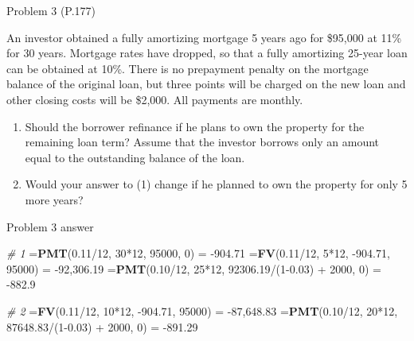 \documentclass[ignorenonframetext,]{beamer}
\newenvironment{Shaded}{\begin{snugshade}}{\end{snugshade}}
\newcommand{\KeywordTok}[1]{\textcolor[rgb]{0.13,0.29,0.53}{\textbf{{#1}}}}
\newcommand{\DecValTok}[1]{\textcolor[rgb]{0.00,0.00,0.81}{{#1}}}
\newcommand{\FloatTok}[1]{\textcolor[rgb]{0.00,0.00,0.81}{{#1}}}
\newcommand{\StringTok}[1]{\textcolor[rgb]{0.31,0.60,0.02}{{#1}}}
\newcommand{\CommentTok}[1]{\textcolor[rgb]{0.56,0.35,0.01}{\textit{{#1}}}}
\newcommand{\NormalTok}[1]{{#1}}
\providecommand{\tightlist}{%
\setlength{\itemsep}{0pt}\setlength{\parskip}{0pt}}
\begin{document}
\begin{frame}{Problem 3 (P.177)}

An investor obtained a fully amortizing mortgage 5 years ago for
\$95,000 at 11\% for 30 years. Mortgage rates have dropped, so that a
fully amortizing 25-year loan can be obtained at 10\%. There is no
prepayment penalty on the mortgage balance of the original loan, but
three points will be charged on the new loan and other closing costs
will be \$2,000. All payments are monthly.

\begin{enumerate}
\def\labelenumi{\alph{enumi}.}
\tightlist
\item
  Should the borrower refinance if he plans to own the property for the
  remaining loan term? Assume that the investor borrows only an amount
  equal to the outstanding balance of the loan.
\item
  Would your answer to (1) change if he planned to own the property for
  only 5 more years?
\end{enumerate}

\small

\end{frame}

\begin{frame}[fragile]{Problem 3 answer}

\begin{Shaded}
\begin{Highlighting}[]
\CommentTok{# 1}
\NormalTok{=}\KeywordTok{PMT}\NormalTok{(}\FloatTok{0.11}\NormalTok{/}\DecValTok{12}\NormalTok{, }\DecValTok{30}\NormalTok{*}\DecValTok{12}\NormalTok{, }\DecValTok{95000}\NormalTok{, }\DecValTok{0}\NormalTok{) =}\StringTok{ }\NormalTok{-}\FloatTok{904.71}
\NormalTok{=}\KeywordTok{FV}\NormalTok{(}\FloatTok{0.11}\NormalTok{/}\DecValTok{12}\NormalTok{, }\DecValTok{5}\NormalTok{*}\DecValTok{12}\NormalTok{, -}\FloatTok{904.71}\NormalTok{, }\DecValTok{95000}\NormalTok{) =}\StringTok{ }\NormalTok{-}\DecValTok{92}\NormalTok{,}\FloatTok{306.19}
\NormalTok{=}\KeywordTok{PMT}\NormalTok{(}\FloatTok{0.10}\NormalTok{/}\DecValTok{12}\NormalTok{, }\DecValTok{25}\NormalTok{*}\DecValTok{12}\NormalTok{, }\FloatTok{92306.19}\NormalTok{/(}\DecValTok{1}\FloatTok{-0.03}\NormalTok{) +}\StringTok{ }\DecValTok{2000}\NormalTok{, }\DecValTok{0}\NormalTok{) =}
\StringTok{  }\NormalTok{-}\FloatTok{882.9}

\CommentTok{# 2}
\NormalTok{=}\KeywordTok{FV}\NormalTok{(}\FloatTok{0.11}\NormalTok{/}\DecValTok{12}\NormalTok{, }\DecValTok{10}\NormalTok{*}\DecValTok{12}\NormalTok{, -}\FloatTok{904.71}\NormalTok{, }\DecValTok{95000}\NormalTok{) =}\StringTok{ }\NormalTok{-}\DecValTok{87}\NormalTok{,}\FloatTok{648.83}
\NormalTok{=}\KeywordTok{PMT}\NormalTok{(}\FloatTok{0.10}\NormalTok{/}\DecValTok{12}\NormalTok{, }\DecValTok{20}\NormalTok{*}\DecValTok{12}\NormalTok{, }\FloatTok{87648.83}\NormalTok{/(}\DecValTok{1}\FloatTok{-0.03}\NormalTok{) +}\StringTok{ }\DecValTok{2000}\NormalTok{, }\DecValTok{0}\NormalTok{) =}\StringTok{ }
\StringTok{  }\NormalTok{-}\FloatTok{891.29}
\end{Highlighting}
\end{Shaded}

\end{frame}
\end{document}
